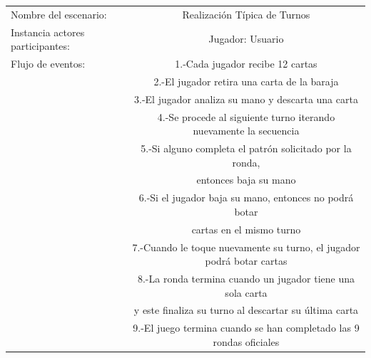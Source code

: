\documentclass[60pt]{article}
\begin{document}
\begin{center}
    \begin{tabular}{ l | c  }
        Nombre del escenario: & Realización Típica de Turnos \\
        Instancia actores participantes: & Jugador: Usuario \\\hline
        Flujo de eventos: &  1.-Cada jugador recibe 12 cartas\\
        & 2.-El jugador retira una carta de la \gls{baraja}\\   
        & 3.-El jugador analiza su mano y descarta una carta\\  
        & 4.-Se procede al siguiente turno iterando nuevamente la secuencia\\
        & 5.-Si alguno completa el \gls{patrón} solicitado por la ronda,\\
        & entonces baja su mano\\
        & 6.-Si el jugador baja su mano, entonces no podrá botar \\
        & cartas en el mismo turno\\
        & 7.-Cuando le toque nuevamente su turno, el jugador podrá botar cartas\\
        & 8.-La ronda termina cuando un jugador tiene una sola carta\\
        & y este finaliza su turno al descartar su última carta\\
        & 9.-El juego termina cuando se han completado las 9 rondas oficiales\\
        \hline
    \end{tabular}
\end{center}
\end{document}
